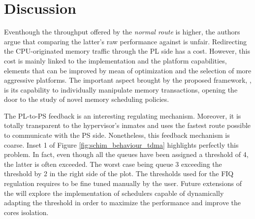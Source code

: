 \section{Discussion}
Eventhough the throughput offered by the \emph{normal route} is higher, the
authors argue that comparing the latter's raw performance against \schim is unfair.
Redirecting the CPU-originated memory traffic through the PL side has a cost.
However, this cost is mainly linked to the implementation and the platform capabilities, elements that can be improved by mean of optimization and the selection of more aggressive platforms.
The important aspect brought by the proposed framework, \schim, is its capability to individually manipulate memory transactions, opening the door to the study of novel memory scheduling policies.

The PL-to-PS feedback is an interesting regulating mechanism. Moreover, it is totally transparent to the hypervisor's inmates and uses the fastest route possible to communicate with the PS side. Nonetheless, this feedback mechanism is coarse. Inset 1 of Figure \ref{fig:schim_behaviour_tdma} highlights perfectly this problem. In fact, even though all the queues have been assigned a threshold of 4, the latter is often exceeded. The worst case being queue 3 exceeding the threshold by 2 in the right side of the plot.
The thresholds used for the FIQ regulation requires to be fine tuned manually by the user. Future extensions of the \schim will explore the implementation of schedulers capable of dynamically adapting the threshold in order to maximize the performance and improve the cores isolation.
